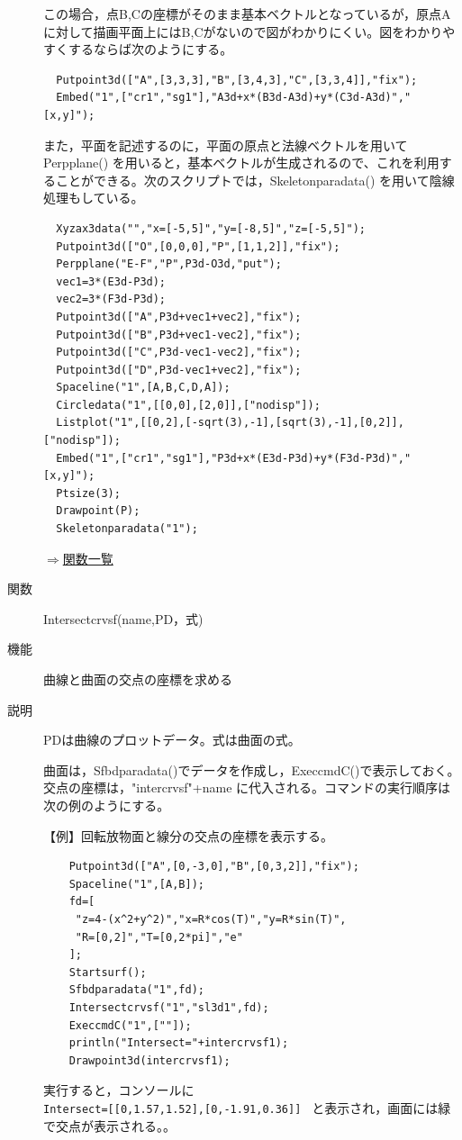 \documentclass[papersize,a4paper,12pt,uplatex]{jsarticle}
\begin{document}
\begin{description}
この場合，点B,Cの座標がそのまま基本ベクトルとなっているが，原点Aに対して描画平面上にはB,Cがないので図がわかりにくい。図をわかりやすくするならば次のようにする。
\begin{verbatim}
  Putpoint3d(["A",[3,3,3],"B",[3,4,3],"C",[3,3,4]],"fix");
  Embed("1",["cr1","sg1"],"A3d+x*(B3d-A3d)+y*(C3d-A3d)","[x,y]");
\end{verbatim}

  また，平面を記述するのに，平面の原点と法線ベクトルを用いて Perpplane() を用いると，基本ベクトルが生成されるので、これを利用することができる。次のスクリプトでは，Skeletonparadata() を用いて陰線処理もしている。
\begin{verbatim}
  Xyzax3data("","x=[-5,5]","y=[-8,5]","z=[-5,5]");
  Putpoint3d(["O",[0,0,0],"P",[1,1,2]],"fix");
  Perpplane("E-F","P",P3d-O3d,"put");
  vec1=3*(E3d-P3d);
  vec2=3*(F3d-P3d);
  Putpoint3d(["A",P3d+vec1+vec2],"fix");
  Putpoint3d(["B",P3d+vec1-vec2],"fix");
  Putpoint3d(["C",P3d-vec1-vec2],"fix");
  Putpoint3d(["D",P3d-vec1+vec2],"fix");
  Spaceline("1",[A,B,C,D,A]);
  Circledata("1",[[0,0],[2,0]],["nodisp"]);
  Listplot("1",[[0,2],[-sqrt(3),-1],[sqrt(3),-1],[0,2]],["nodisp"]);
  Embed("1",["cr1","sg1"],"P3d+x*(E3d-P3d)+y*(F3d-P3d)","[x,y]");
  Ptsize(3);
  Drawpoint(P);
  Skeletonparadata("1");
\end{verbatim}
         \begin{center}  \end{center}

\begin{flushright} \hyperlink{functionlist}{$\Rightarrow$関数一覧}\end{flushright}


\hypertarget{intersectcrvsf}{}
\item[関数]  Intersectcrvsf(name,PD，式)
\item[機能]  曲線と曲面の交点の座標を求める
\item[説明]  PDは曲線のプロットデータ。式は曲面の式。

  曲面は，Sfbdparadata()でデータを作成し，ExeccmdC()で表示しておく。交点の座標は，"intercrvsf"+name に代入される。コマンドの実行順序は次の例のようにする。

\vspace{\baselineskip}
【例】回転放物面と線分の交点の座標を表示する。
\begin{verbatim}
    Putpoint3d(["A",[0,-3,0],"B",[0,3,2]],"fix");
    Spaceline("1",[A,B]);
    fd=[
     "z=4-(x^2+y^2)","x=R*cos(T)","y=R*sin(T)",
     "R=[0,2]","T=[0,2*pi]","e"
    ];
    Startsurf();
    Sfbdparadata("1",fd);
    Intersectcrvsf("1","sl3d1",fd);
    ExeccmdC("1",[""]);
    println("Intersect="+intercrvsf1);
    Drawpoint3d(intercrvsf1); 
\end{verbatim}
実行すると，コンソールに\\
    \verb|Intersect=[[0,1.57,1.52],[0,-1.91,0.36]] |
と表示され，画面には緑で交点が表示される。。



\end{description}
\end{document}
